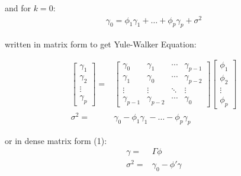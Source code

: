 \begin{itemize}[topsep=2pt,itemsep=0pt]
        and for $ k=0 $:
        \begin{align}
            \gamma _0=\phi _1\gamma _1+\ldots+\phi _p\gamma _p+\sigma ^2
        \end{align}



        written in matrix form to get Yule-Walker Equation:
        
        \begin{align}
            \begin{bmatrix}
                \gamma _1\\\gamma _2\\ \vdots\\\gamma _p
            \end{bmatrix} =&
            \begin{bmatrix}
                \gamma _0&\gamma _1&\cdots&\gamma _{p-1}\\
                \gamma _1&\gamma _0&\cdots&\gamma _{p-2}\\
                \vdots&\vdots&\ddots&\vdots\\
                \gamma _{p-1}&\gamma _{p-2}&\cdots&\gamma _0
            \end{bmatrix}
            \begin{bmatrix}
                \phi _1\\\phi _2\\ \vdots \\\phi _p
            \end{bmatrix}\\
            \sigma ^2 =& \gamma _0-\phi _1\gamma _1-\ldots-\phi _p\gamma _p
        \end{align}
        
        or in dense matrix form (1):
        \begin{align}
            \gamma =&\Gamma \phi \\
            \sigma ^2=&\gamma _0-\phi '\gamma 
        \end{align}


\end{itemize}
